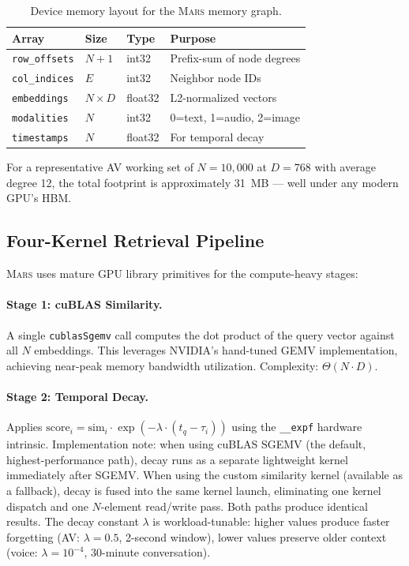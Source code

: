 \documentclass[11pt]{article}
\newcommand{\mars}{\textsc{Mars}}
\begin{document}
\begin{table}[ht]
\centering
\small
\caption{Device memory layout for the \mars{} memory graph.}
\label{tab:layout}
\begin{tabular}{llll}
\toprule
\textbf{Array} & \textbf{Size} & \textbf{Type} & \textbf{Purpose} \\
\midrule
\texttt{row\_offsets} & $N{+}1$     & int32   & Prefix-sum of node degrees \\
\texttt{col\_indices} & $E$         & int32   & Neighbor node IDs \\
\texttt{embeddings}   & $N \times D$ & float32 & L2-normalized vectors \\
\texttt{modalities}   & $N$         & int32   & 0=text, 1=audio, 2=image \\
\texttt{timestamps}   & $N$         & float32 & For temporal decay \\
\bottomrule
\end{tabular}
\end{table}

\noindent For a representative AV working set of $N{=}10{,}000$ at
$D{=}768$ with average degree 12, the total footprint is approximately
31~MB --- well under any modern GPU's HBM.

\subsection{Four-Kernel Retrieval Pipeline}

\mars{} uses mature GPU library primitives for the
compute-heavy stages:

\paragraph{Stage 1: cuBLAS Similarity.}
A single \texttt{cublasSgemv} call computes the dot product of the query
vector against all $N$ embeddings. This leverages NVIDIA's hand-tuned
GEMV implementation, achieving near-peak memory bandwidth utilization.
Complexity: $\Theta(N \cdot D)$.

\paragraph{Stage 2: Temporal Decay.}
Applies $\text{score}_i = \text{sim}_i \cdot \exp(-\lambda \cdot
(t_q - \tau_i))$ using the \texttt{\_\_expf} hardware intrinsic.
Implementation note: when using cuBLAS SGEMV (the default, highest-performance
path), decay runs as a separate lightweight kernel immediately after
SGEMV. When using the custom similarity kernel (available as a fallback),
decay is fused into the same kernel launch, eliminating one kernel
dispatch and one $N$-element read/write pass. Both paths produce
identical results. The decay constant $\lambda$ is workload-tunable:
higher values produce faster forgetting (AV: $\lambda = 0.5$, 2-second
window), lower values preserve older context (voice: $\lambda = 10^{-4}$,
30-minute conversation).
\end{document}
